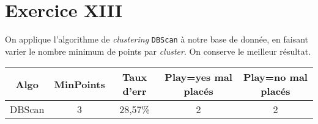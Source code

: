 \documentclass[a4paper, 11pt]{report}
\begin{document}
        \section{Exercice XIII}
        	On applique l'algorithme de \emph{clustering} \texttt{DBScan} à notre base de donnée, en faisant varier le nombre minimum de points par \emph{cluster}. On conserve le meilleur résultat.

    	\begin{table}[h!]
    		\centering
    		\begin{tabular}{|c|c|c|c|c|}
    		\hline
    		Algo & MinPoints & Taux d'err & Play=yes mal placés & Play=no mal placés \\
    		\hline
    		DBScan & 3 & 28,57\% & 2 & 2\\
    		\hline
    		\end{tabular}
    	\end{table}
\end{document}
